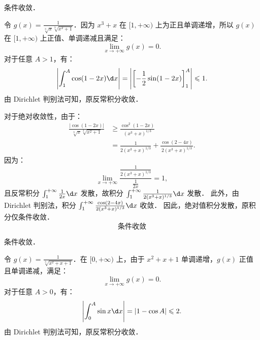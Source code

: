 \begin{solution}
     条件收敛．

    令 $g(x) = \frac{1}{\sqrt[3]{x} \sqrt[3]{x^2 + 1}}$．因为 $x^3+x$ 在 $[1, +\infty)$ 上为正且单调递增，所以 $g(x)$ 在 $[1, +\infty)$ 上正值、单调递减且满足：
    \begin{equation}
        \lim_{x \to +\infty} g(x) = 0.
    \end{equation}
    对于任意 $A > 1$，有：
    \begin{equation}
        \left| \int_1^A \cos(1 - 2x) \d x \right| = \left| \left[ -\frac{1}{2} \sin(1 - 2x) \right]_1^A \right| \leqslant 1.
    \end{equation}
    由 Dirichlet 判别法可知，原反常积分收敛．

    对于绝对收敛性，由于：
    \begin{equation}
        \begin{aligned}
            \frac{|\cos(1 - 2x)|}{\sqrt[3]{x} \sqrt[3]{x^2 + 1}} & \geqslant \frac{\cos^2(1 - 2x)}{(x^3 + x)^{1/3}}                      \\
                                                                 & = \frac{1}{2(x^3 + x)^{1/3}} + \frac{\cos(2 - 4x)}{2(x^3 + x)^{1/3}}.
        \end{aligned}
    \end{equation}
    因为：
    \begin{equation}
        \lim_{x \to +\infty} \frac{\frac{1}{2(x^3+x)^{1/3}}}{\frac{1}{2x}} = 1,
    \end{equation}
    且反常积分 $\int_1^{+\infty} \frac{1}{2x} \d x$ 发散，故积分 $\int_1^{+\infty} \frac{1}{2(x^3 + x)^{1/3}} \d x$ 发散．
    此外，由 Dirichlet 判别法，积分 $\int_1^{+\infty} \frac{\cos(2 - 4x)}{2(x^3 + x)^{1/3}} \d x$ 收敛．
    因此，绝对值积分发散，原积分仅条件收敛．
    \begin{equation}
        \boxed{\text{条件收敛}}
    \end{equation}

     条件收敛．

    令 $g(x) = \frac{1}{\sqrt[3]{x^2 + x + 1}}$．在 $[0, +\infty)$ 上，由于 $x^2 + x + 1$ 单调递增，$g(x)$ 正值且单调递减，满足：
    \begin{equation}
        \lim_{x \to +\infty} g(x) = 0.
    \end{equation}
    对于任意 $A > 0$，有：
    \begin{equation}
        \left| \int_0^A \sin x \d x \right| = |1 - \cos A| \leqslant 2.
    \end{equation}
    由 Dirichlet 判别法可知，原反常积分收敛．


\end{solution}
